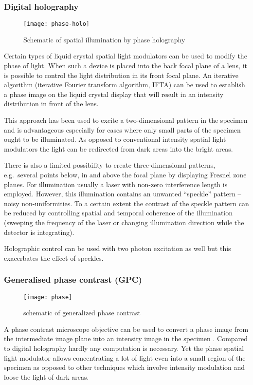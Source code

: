 \subsubsection{Digital holography}
\begin{figure}[!hbt]
  \centering
  \texttt{[image: phase-holo]} 
  \caption{Schematic of spatial illumination by phase holography
    }
  \label{fig:phase-holo}
\end{figure}
Certain types of liquid crystal spatial light modulators can be used
to modify the phase of light. When such a device is placed into the
back focal plane of a lens, it is possible to control the light
distribution in its front focal plane. An iterative algorithm
(iterative Fourier transform algorithm, IFTA) can be used to establish
a phase image on the liquid crystal display that will result in an
intensity distribution in front of the lens.


This approach has been used to excite a two-dimensional pattern in the
specimen \citep{Lutz2008,Zahid2010} and is advantageous especially for
cases where only small parts of the specimen ought to be
illuminated. As opposed to conventional intensity spatial light
modulators the light can be redirected from dark areas into the bright
areas.

There is also a limited possibility to create three-dimensional
patterns, e.g.\ several points below, in and above the focal plane by
displaying Fresnel zone planes.  For illumination usually a laser with
non-zero interference length is employed. However, this illumination
contains an unwanted ``speckle'' pattern -- noisy non-uniformities. To
a certain extent the contrast of the speckle pattern can be reduced by
controlling spatial and temporal coherence of the illumination
(sweeping the frequency of the laser or changing illumination
direction while the detector is integrating).

Holographic control can be used with two photon excitation as well
\citep{Nikolenko2008} %
but this exacerbates the effect of speckles.
\subsubsection{Generalised phase contrast (GPC)}
\begin{figure}[!hbt]
  \centering
  \texttt{[image: phase]} %
  \caption{schematic of generalized phase contrast \citep{Rodrigo2008}}
  \label{fig:phase}
\end{figure}
A phase contrast microscope objective  can be used to
convert a phase image from the intermediate image plane into an
intensity image in the specimen \citep{Rodrigo2008}. Compared to digital holography hardly any computation is
necessary. Yet the phase spatial light modulator allows concentrating
a lot of light even into a small region of the specimen as opposed to
other techniques which involve intensity modulation and loose the
light of dark areas.

